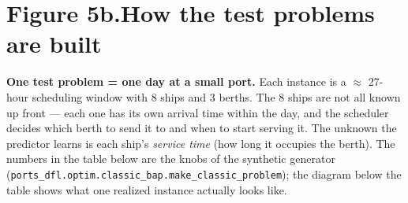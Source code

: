 \documentclass[11pt]{article}
\begin{document}

\newpage

\section*{Figure 5b.\quad How the test problems are built}

\noindent
\textbf{One test problem = one day at a small port.} Each instance is
a $\approx$ 27-hour scheduling window with 8 ships and 3 berths. The
8 ships are not all known up front --- each one has its own arrival
time within the day, and the scheduler decides which berth to send it
to and when to start serving it. The unknown the predictor learns is
each ship's \emph{service time} (how long it occupies the berth).
The numbers in the table below are the knobs of the synthetic
generator (\texttt{ports\_dfl.optim.classic\_bap.make\_classic\_problem});
the diagram below the table shows what one realized instance actually
looks like.

\vspace{0.5em}
\end{document}
